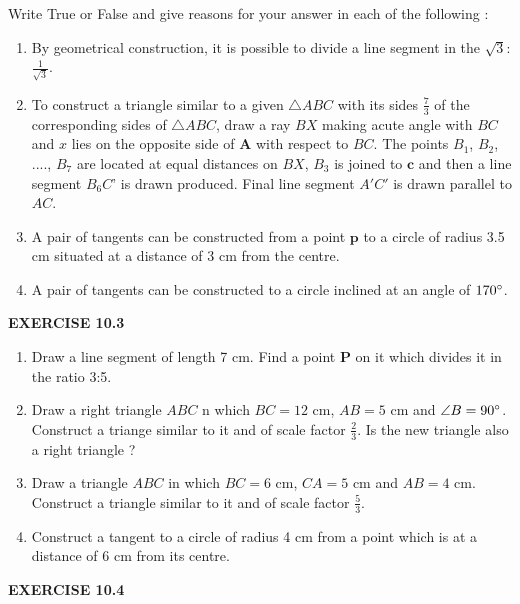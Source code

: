 \documentclass[12pt]{article}
\let\vec\mathbf
\begin{document}
Write True or False and give reasons for your answer in each of the following :
\begin{enumerate}
	\item By geometrical construction, it is possible to divide a line segment in the $\sqrt{3}$: $\frac{1}{\sqrt{3}}$.
\item To construct a triangle similar to a given $\triangle{ABC}$ with its sides $\frac{7}{3}$ of the corresponding sides of $\triangle{ABC}$, draw a ray $BX$ making acute angle with $BC$ and $x$ lies on 
the opposite side of $\vec{A}$ with respect to $BC$. The points $B_1$, $B_2$, ...., $B_7$ are located at equal distances on $BX$, $B_3$ is joined to $\vec{c}$ and then a line segment $B_6C$' is drawn produced. Final line segment $A'C'$ is drawn parallel to $AC$.
\item A pair of tangents can be constructed from a point $\vec{p}$ to a circle of radius 3.5 cm situated at a distance of 3 cm from the centre.
\item A pair of tangents can be constructed to a circle inclined at an angle of $170\degree$.
\end{enumerate}
\begin{center}                            \textbf{EXERCISE 10.3}                    \end{center}
	\begin{enumerate}
\item Draw a line segment of length 7 cm. Find a point $\vec{P}$ on it which divides it in the ratio 3:5.
\item Draw a right triangle ${ABC}$ n which $BC=12$ cm, $AB=5$ cm and $\angle{B}=90\degree$.
Construct a triange similar to it and of scale factor $\frac{2}{3}$. Is the new triangle also a right triangle ?
\item Draw a triangle ${ABC}$ in which $BC=6$ cm, $CA=5$ cm and $AB=4$ cm. Construct a triangle similar to it and of scale factor $\frac{5}{3}$.
\item Construct a tangent to a circle of radius 4 cm from a point which is at a distance of 6 cm from its centre.
	\end{enumerate}
	\begin{center}                            \textbf{EXERCISE 10.4}                    \end{center}
\end{document}
